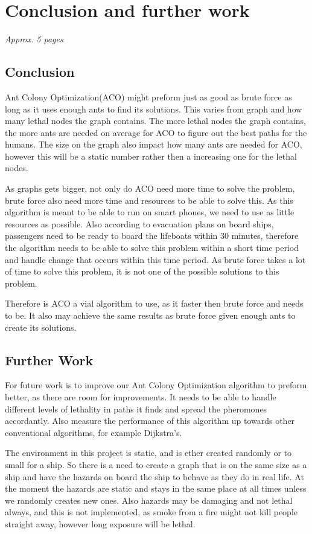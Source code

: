 \chapter{Conclusion and further work}
\label{ch:conclusion}
\textit{Approx. 5 pages}



\section{Conclusion}
Ant Colony Optimization(ACO) might preform just as good as brute force as long as it uses enough ants to find its solutions. This varies from graph and how many lethal nodes the graph contains. The more lethal nodes the graph contains, the more ants are needed on average for ACO to figure out the best paths for the humans. The size on the graph also impact how many ants are needed for ACO, however this will be a static number rather then a increasing one for the lethal nodes. 

As graphs gets bigger, not only do ACO need more time to solve the problem, brute force also need more time and resources to be able to solve this. As this algorithm is meant to be able to run on smart phones, we need to use as little resources as possible. Also according to evacuation plans on board ships, passengers need to be ready to board the lifeboats within 30 minutes, therefore the algorithm needs to be able to solve this problem within a short time period and handle change that occurs within this time period. As brute force takes a lot of time to solve this problem, it is not one of the possible solutions to this problem.

Therefore is ACO a vial algorithm to use, as it faster then brute force and needs to be. It also may achieve the same results as brute force given enough ants to create its solutions.

\section{Further Work}

For future work is to improve our Ant Colony Optimization algorithm to preform better, as there are room for improvements. It needs to be able to handle different levels of lethality in paths it finds and spread the pheromones accordantly. Also measure the performance of this algorithm up towards other conventional algorithms, for example Dijkstra's.

The environment in this project is static, and is ether created randomly or to small for a ship. So there is a need to create a graph that is on the same size as a ship and have the hazards on board the ship to behave as they do in real life. At the moment the hazards are static and stays in the same place at all times unless we randomly creates new ones. Also hazards may be damaging and not lethal always, and this is not implemented, as smoke from a fire might not kill people straight away, however long exposure will be lethal.